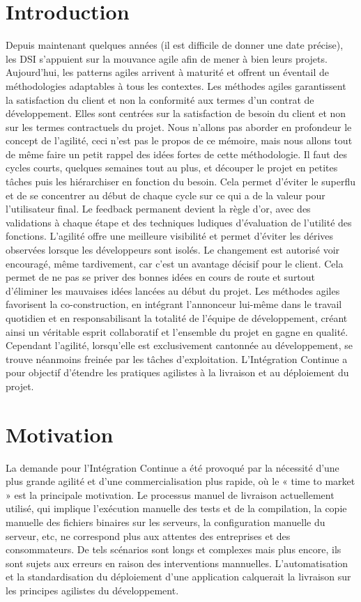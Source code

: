 \documentclass{report}
\begin{document}
    \section{Introduction}
    Depuis maintenant quelques années (il est difficile de donner une date précise), les DSI s’appuient sur la mouvance agile afin de mener à bien leurs projets. Aujourd’hui, les patterns agiles arrivent à maturité et offrent un éventail de méthodologies adaptables à tous les contextes. Les méthodes agiles garantissent la satisfaction du client et non la conformité aux termes d’un contrat de développement. Elles sont centrées sur la satisfaction de besoin du client et non sur les termes contractuels du projet. Nous n’allons pas aborder en profondeur le concept de l’agilité, ceci n’est pas le propos de ce mémoire, mais nous allons tout de même faire un petit rappel des idées fortes de cette méthodologie. Il faut des cycles courts, quelques semaines tout au plus, et découper le projet en petites tâches puis les hiérarchiser en fonction du besoin. Cela permet d’éviter le superflu et de se concentrer au début de chaque cycle sur ce qui a de la valeur pour l’utilisateur final. Le feedback permanent devient la règle d’or, avec des validations à chaque étape et des techniques ludiques d’évaluation de l’utilité des fonctions. L’agilité offre une meilleure visibilité et permet d’éviter les dérives observées lorsque les développeurs sont isolés. Le changement est autorisé voir encouragé, même tardivement, car c’est un avantage décisif pour le client. Cela permet de ne pas se priver des bonnes idées en cours de route et surtout d’éliminer les mauvaises idées lancées au début du projet. Les méthodes agiles favorisent la co-construction, en intégrant l’annonceur lui-même dans le travail quotidien et en responsabilisant la totalité de l’équipe de développement, créant ainsi un véritable esprit collaboratif et l’ensemble du projet en gagne en qualité.\\

    Cependant l’agilité, lorsqu’elle est exclusivement cantonnée au développement, se trouve néanmoins freinée par les tâches d’exploitation. L'Intégration Continue a pour objectif d’étendre les pratiques agilistes à la livraison et au déploiement du projet.

    \section{Motivation}
    La demande pour l'Intégration Continue a été provoqué par la nécessité d'une plus grande agilité et d'une commercialisation plus rapide, où le « time to market » est la principale motivation. Le processus manuel de livraison actuellement utilisé, qui implique l'exécution manuelle des tests et de la compilation, la copie manuelle des fichiers binaires sur les serveurs, la configuration manuelle du serveur, etc, ne correspond plus aux attentes des entreprises et des consommateurs. De tels scénarios sont longs et complexes mais plus encore, ils sont sujets aux erreurs en raison des interventions mannuelles. L'automatisation et la standardisation du déploiement d'une application calquerait la livraison sur les principes agilistes du développement.
\end{document}
